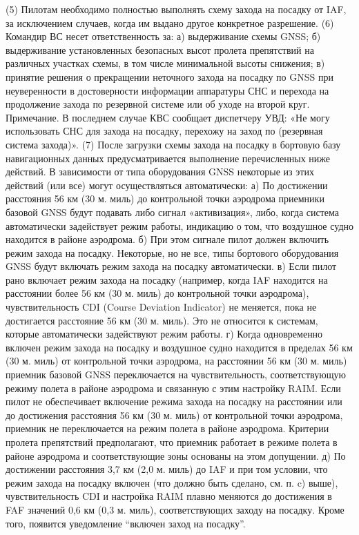 (5) Пилотам необходимо полностью выполнять схему захода на посадку от IAF, за исключением случаев, когда им выдано другое конкретное разрешение. 
(6) Командир ВС несет ответственность за:
а)	выдерживание схемы GNSS;
б)	выдерживание установленных безопасных высот пролета препятствий на различных участках схемы, в том числе минимальной высоты снижения;
в)	принятие решения о прекращении неточного захода на посадку по GNSS при неуверенности в достоверности информации аппаратуры СНС и перехода на продолжение захода по резервной системе или об уходе на второй круг.
Примечание. В последнем случае КВС сообщает диспетчеру УВД: «Не могу использовать СНС для захода на посадку, перехожу на заход по (резервная система захода)».
(7) После загрузки схемы захода на посадку в бортовую базу навигационных данных предусматривается выполнение перечисленных ниже действий. В зависимости от типа оборудования GNSS некоторые из этих действий (или все) могут осуществляться автоматически:
а)	По достижении расстояния 56 км (30 м. миль) до контрольной точки аэродрома приемники базовой GNSS будут подавать либо сигнал «активизация», либо, когда система автоматически задействует режим работы, индикацию о том, что воздушное судно находится в районе аэродрома.
б)	При этом сигнале пилот должен включить режим захода на посадку. Некоторые, но не все, типы бортового оборудования GNSS будут включать режим захода на посадку автоматически.
в)	Если пилот рано включает режим захода на посадку (например, когда IAF находится на расстоянии более 56 км (30 м. миль) до контрольной точки аэродрома), чувствительность CDI (Course Deviation Indicator) не меняется, пока не достигается расстояние 56 км (30 м. миль). Это не относится к системам, которые автоматически задействуют режим работы.
г)	Когда одновременно включен режим захода на посадку и воздушное судно находится в пределах 56 км (30 м. миль) от контрольной точки аэродрома, на расстоянии 56 км (30 м. миль) приемник базовой GNSS переключается на чувствительность, соответствующую режиму полета в районе аэродрома и связанную с этим настройку RAIM. Если пилот не обеспечивает включение режима захода на посадку на расстоянии или до достижения расстояния 56 км (30 м. миль) от контрольной точки аэродрома, приемник не переключается на режим полета в районе аэродрома. Критерии пролета препятствий предполагают, что приемник работает в режиме полета в районе аэродрома и соответствующие зоны основаны на этом допущении.
д)	По достижении расстояния 3,7 км (2,0 м. миль) до IAF и при том условии, что режим захода на посадку включен (что должно быть сделано, см. п. c) выше), чувствительность CDI и настройка RAIM плавно меняются до достижения в FAF значений 0,6 км (0,3 м. миль), соответствующих заходу на посадку. Кроме того, появится уведомление “включен заход на посадку”.
